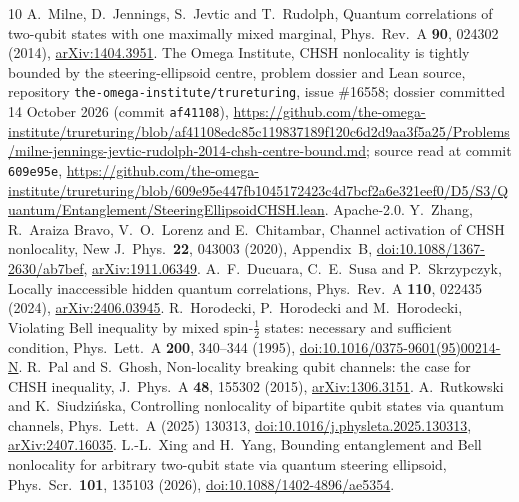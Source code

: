 \documentclass[11pt]{article}
\theoremstyle{remark}\newtheorem{remark}[theorem]{Remark}
\begin{document}
\begingroup\small
\begin{thebibliography}{10}
A.~Milne, D.~Jennings, S.~Jevtic and T.~Rudolph,
Quantum correlations of two-qubit states with one maximally mixed marginal,
Phys.\ Rev.\ A \textbf{90}, 024302 (2014),
\href{https://arxiv.org/abs/1404.3951}{arXiv:1404.3951}.
The Omega Institute, CHSH nonlocality is tightly bounded by the
steering-ellipsoid centre, problem dossier and Lean source, repository
\texttt{the-omega-institute/trureturing}, issue \#16558; dossier committed
14 October 2026 (commit \texttt{af41108}),
\url{https://github.com/the-omega-institute/trureturing/blob/af41108edc85c119837189f120c6d2d9aa3f5a25/Problems/milne-jennings-jevtic-rudolph-2014-chsh-centre-bound.md};
source read at commit \texttt{609e95e},
\url{https://github.com/the-omega-institute/trureturing/blob/609e95e447fb1045172423c4d7bcf2a6e321eef0/D5/S3/Quantum/Entanglement/SteeringEllipsoidCHSH.lean}.
Apache-2.0.
Y.~Zhang, R.~Araiza Bravo, V.~O.~Lorenz and E.~Chitambar,
Channel activation of CHSH nonlocality, New J.\ Phys.\ \textbf{22}, 043003
(2020), Appendix~B,
\href{https://doi.org/10.1088/1367-2630/ab7bef}{doi:10.1088/1367-2630/ab7bef},
\href{https://arxiv.org/abs/1911.06349}{arXiv:1911.06349}.
A.~F.~Ducuara, C.~E.~Susa and P.~Skrzypczyk,
Locally inaccessible hidden quantum correlations, Phys.\ Rev.\ A \textbf{110},
022435 (2024), \href{https://arxiv.org/abs/2406.03945}{arXiv:2406.03945}.
R.~Horodecki, P.~Horodecki and M.~Horodecki,
Violating Bell inequality by mixed spin-$\frac12$ states: necessary and
sufficient condition, Phys.\ Lett.\ A \textbf{200}, 340--344 (1995),
\href{https://doi.org/10.1016/0375-9601(95)00214-N}{doi:10.1016/0375-9601(95)00214-N}.
R.~Pal and S.~Ghosh, Non-locality breaking qubit channels: the case for CHSH
inequality, J.\ Phys.\ A \textbf{48}, 155302 (2015),
\href{https://arxiv.org/abs/1306.3151}{arXiv:1306.3151}.
A.~Rutkowski and K.~Siudzi\'nska, Controlling nonlocality of bipartite qubit
states via quantum channels, Phys.\ Lett.\ A (2025) 130313,
\href{https://doi.org/10.1016/j.physleta.2025.130313}{doi:10.1016/j.physleta.2025.130313},
\href{https://arxiv.org/abs/2407.16035}{arXiv:2407.16035}.
L.-L.~Xing and H.~Yang, Bounding entanglement and Bell nonlocality for
arbitrary two-qubit state via quantum steering ellipsoid, Phys.\ Scr.\
\textbf{101}, 135103 (2026),
\href{https://doi.org/10.1088/1402-4896/ae5354}{doi:10.1088/1402-4896/ae5354}.
\end{thebibliography}
\endgroup
\end{document}
